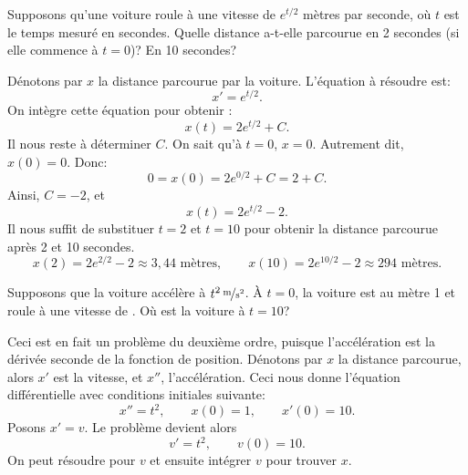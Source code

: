 \begin{example}
	Supposons qu'une voiture roule à une vitesse de $e^{t/2}$ mètres par seconde,
	où $t$ est le temps mesuré en secondes.
	Quelle distance a-t-elle parcourue en 2 secondes (si elle commence à $t=0$)?
	En 10 secondes?

	Dénotons par $x$ la distance parcourue par la voiture.
	L'équation à résoudre est:
	\begin{equation*}
		x' = e^{t/2} .
	\end{equation*}
	On intègre cette équation pour obtenir :
	\begin{equation*}
		x(t) = 2 e^{t/2} + C .
	\end{equation*}
	Il nous reste à déterminer $C$.  On sait qu'à $t=0$,
	$x=0$.  Autrement dit, $x(0) = 0$.  Donc:
	\begin{equation*}
		0 = x(0) = 2e^{0/2} + C = 2 + C .
	\end{equation*}
	Ainsi, $C = -2$, et
	\begin{equation*}
		x(t) = 2 e^{t/2} - 2 .
	\end{equation*}
	Il nous suffit de substituer $t=2$ et $t=10$ pour obtenir la distance parcourue après 2 et 10 secondes.
	\begin{equation*}
		x(2) = 2e^{2/2} - 2 \approx 3,44 \text{ mètres} ,
		\qquad
		x(10) = 2e^{10/2} - 2 \approx 294 \text{ mètres} .
	\end{equation*}
\end{example}

\begin{example}
	Supposons que la voiture accélère à $\unitfrac[t^2]{m}{s^2}$.
	À $t=0$, la voiture est au mètre 1 et roule à une vitesse de .
	Où est la voiture à $t=10$?

	Ceci est en fait un problème du deuxième ordre, puisque l'accélération est la dérivée seconde de la fonction de position.
	Dénotons par $x$ la distance parcourue, alors $x'$ est la vitesse, et $x''$, l'accélération.
	Ceci nous donne l'équation différentielle avec conditions initiales suivante:
	\begin{equation*}
		x'' = t^2 , \qquad x(0) = 1 , \qquad x'(0) = 10 .
	\end{equation*}
	Posons $x' = v$.  Le problème devient alors
	\begin{equation*}
		v' = t^2, \qquad v(0) = 10 .
	\end{equation*}
	On peut résoudre pour $v$ et ensuite intégrer $v$ pour trouver $x$.
\end{example}

